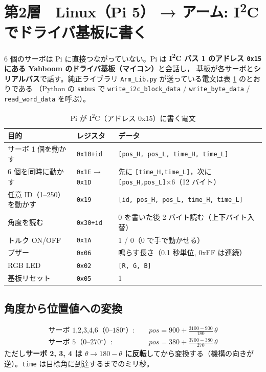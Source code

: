 \documentclass[a4paper,11pt]{article}
\newcommand{\reg}[1]{\texttt{#1}}
\begin{document}
\section{第2層　Linux（Pi 5） → アーム: I\textsuperscript{2}C でドライバ基板に書く}

6 個のサーボは Pi に直接つながっていない。Pi は \textbf{I\textsuperscript{2}C バス 1 のアドレス \reg{0x15} にある Yahboom のドライバ基板（マイコン）}と会話し，
基板が各サーボと\textbf{シリアルバス}で話す。純正ライブラリ \texttt{Arm\_Lib.py} が送っている電文は表 \ref{tab:i2c} のとおりである
（Python の \texttt{smbus} で \texttt{write\_i2c\_block\_data} / \texttt{write\_byte\_data} / \texttt{read\_word\_data} を呼ぶ）。

\begin{table}[h]
\centering\footnotesize
\begin{tabular}{@{}lll@{}}
\toprule
目的 & レジスタ & データ \\
\midrule
サーボ 1 個を動かす & \reg{0x10+id} & \texttt{[pos\_H, pos\_L, time\_H, time\_L]} \\
6 個を同時に動かす & \reg{0x1E} → \reg{0x1D} & 先に \texttt{[time\_H,time\_L]}，次に \texttt{[pos\_H,pos\_L]}×6（12 バイト） \\
任意 ID（1--250）を動かす & \reg{0x19} & \texttt{[id, pos\_H, pos\_L, time\_H, time\_L]} \\
角度を読む & \reg{0x30+id} & 0 を書いた後 2 バイト読む（上下バイト入替） \\
トルク ON/OFF & \reg{0x1A} & 1 / 0（0 で手で動かせる） \\
ブザー & \reg{0x06} & 鳴らす長さ（0.1 秒単位, 0xFF は連続） \\
RGB LED & \reg{0x02} & \texttt{[R, G, B]} \\
基板リセット & \reg{0x05} & 1 \\
\bottomrule
\end{tabular}
\caption{Pi が I\textsuperscript{2}C（アドレス 0x15）に書く電文}\label{tab:i2c}
\end{table}

\subsection*{角度から位置値への変換}
\begin{align*}
\text{サーボ 1,2,3,4,6（0--180$^\circ$）}:&\quad pos = 900 + \frac{3100-900}{180}\,\theta \\
\text{サーボ 5（0--270$^\circ$）}:&\quad pos = 380 + \frac{3700-380}{270}\,\theta
\end{align*}
ただし\textbf{サーボ 2, 3, 4 は $\theta \to 180-\theta$ に反転}してから変換する（機構の向きが逆）。\texttt{time} は目標角に到達するまでのミリ秒。
\end{document}
